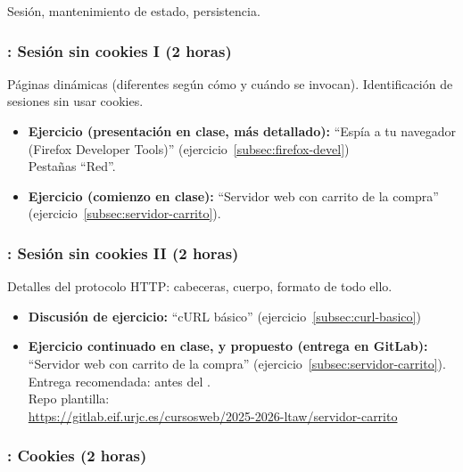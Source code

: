 \documentclass[a4paper,12pt]{article}
\begin{document}
Sesión, mantenimiento de estado, persistencia.

\subsubsection{\lunesB: Sesión sin cookies I (2 horas)}
\label{cal:lunesB}

Páginas dinámicas (diferentes según cómo y cuándo se invocan). Identificación de sesiones sin usar cookies.

\begin{itemize}
\item \textbf{Ejercicio (presentación en clase, más detallado):} ``Espía a tu navegador (Firefox Developer Tools)'' (ejercicio~\ref{subsec:firefox-devel}) \\
  Pestañas ``Red''.
\item \textbf{Ejercicio (comienzo en clase):} ``Servidor web con carrito de la compra'' (ejercicio~\ref{subsec:servidor-carrito}). \\  
\end{itemize}

\subsubsection{\martesB: Sesión sin cookies II  (2 horas)}
\label{cal:martesB}

Detalles del protocolo HTTP: cabeceras, cuerpo, formato de todo ello.

\begin{itemize}
\item \textbf{Discusión de ejercicio:} ``cURL básico'' (ejercicio~\ref{subsec:curl-basico})
\item \textbf{Ejercicio continuado en clase, y propuesto (entrega en GitLab):} ``Servidor web con carrito de la compra'' (ejercicio~\ref{subsec:servidor-carrito}). \\
  Entrega recomendada: antes del \martesC. \\
  Repo plantilla: \\ {\footnotesize \url{https://gitlab.eif.urjc.es/cursosweb/2025-2026-ltaw/servidor-carrito}}
\end{itemize}


\subsubsection{\lunesC: Cookies (2 horas)}
\label{cal:lunesC}
\end{document}
